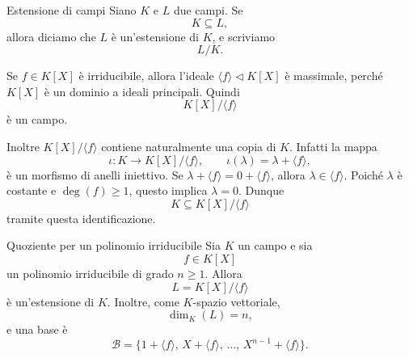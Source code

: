\documentclass[a4paper]{article}
\begin{document}
\begin{radioactive}
\begin{snippetdefinition}{Estensione di campi}
    Siano \(K\) e \(L\) due campi. Se
    \[
        K\subseteq L,
    \]
    allora diciamo che \(L\) è un'estensione di \(K\), e scriviamo
    \[
        L/K.
    \]
\end{snippetdefinition}
\end{radioactive}

\begin{radioactive}
Se \(f\in K[X]\) è irriducibile, allora l'ideale \(\langle f \rangle\triangleleft K[X]\) è massimale, perché \(K[X]\) è un dominio a ideali principali. Quindi
\[
    K[X]/\langle f \rangle
\]
è un campo.

Inoltre \(K[X]/\langle f \rangle\) contiene naturalmente una copia di \(K\). Infatti la mappa
\[
    \iota\colon K\to K[X]/\langle f \rangle,
    \qquad
    \iota(\lambda)=\lambda+\langle f \rangle,
\]
è un morfismo di anelli iniettivo. Se \(\lambda+\langle f \rangle=0+\langle f \rangle\), allora \(\lambda\in\langle f \rangle\). Poiché \(\lambda\) è costante e \(\deg(f)\geq 1\), questo implica \(\lambda=0\). Dunque
\[
    K\subseteq K[X]/\langle f \rangle
\]
tramite questa identificazione.
\end{radioactive}

\begin{radioactive}
\begin{snippetproposition}{Quoziente per un polinomio irriducibile}
    Sia \(K\) un campo e sia
    \[
        f\in K[X]
    \]
    un polinomio irriducibile di grado \(n\geq 1\). Allora
    \[
        L=K[X]/\langle f \rangle
    \]
    è un'estensione di \(K\). Inoltre, come \(K\)-spazio vettoriale,
    \[
        \dim_K(L)=n,
    \]
    e una base è
    \[
        \mathcal{B}
        =
        \{1+\langle f \rangle,\, X+\langle f \rangle,\, \ldots,\, X^{n-1}+\langle f \rangle\}.
    \]
\end{snippetproposition}
\end{radioactive}
\end{document}
